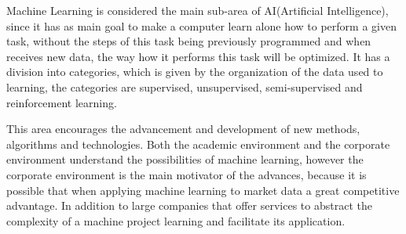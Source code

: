 Machine Learning is considered the main sub-area of AI(Artificial Intelligence), since it has as main goal to make a 
computer learn alone how to perform a given task, without the steps of this task being previously programmed
and when receives new data, the way how it performs this task will be optimized. 
It has a division into categories, which is given by the organization of the data used to learning, the categories are
supervised, unsupervised, semi-supervised and reinforcement learning. 


This area encourages the advancement and development of new methods, algorithms and technologies. Both the academic environment 
and the corporate environment understand the possibilities of machine learning, however the corporate environment is 
the main motivator of the advances, because it is possible that when applying machine learning to market data a 
great competitive advantage. In addition to large companies that offer services to abstract the complexity of a 
machine project learning and facilitate its application.


